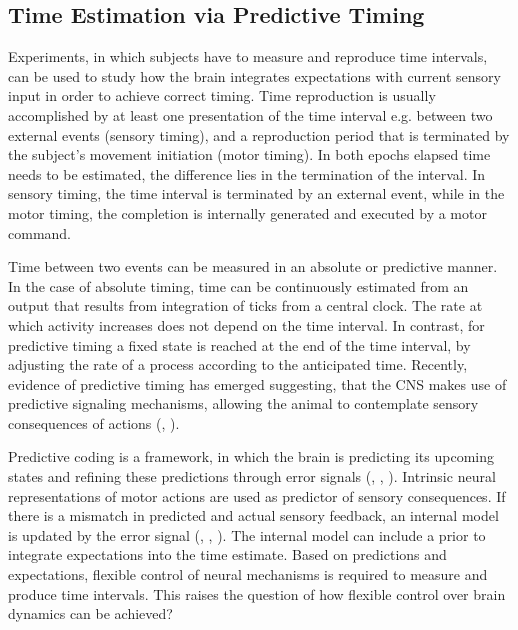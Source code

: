 \documentclass[10pt]{article}
\begin{document}
\subsection{Time Estimation via Predictive Timing}
Experiments, in which subjects have to measure and reproduce time intervals, can be used to study how the brain integrates expectations with current sensory input in order to achieve correct timing.
Time reproduction is usually accomplished by at least one presentation of the time interval e.g. between two external events (sensory timing), and a reproduction period that is terminated by the subject's movement initiation (motor timing).
In both epochs elapsed time needs to be estimated, the difference lies in the termination of the interval. In sensory timing, the time interval is terminated by an external event, while in the motor timing, the completion is internally generated and executed by a motor command.

Time between two events can be measured in an absolute or predictive manner. 
In the case of absolute timing, time can be continuously estimated from an output that results from integration of ticks from a central clock.
The rate at which activity increases does not depend on the time interval. 
In contrast, for predictive timing a fixed state is reached at the end of the time interval, by adjusting the rate of a process according to the anticipated time.
Recently, evidence of predictive timing has emerged suggesting, that the CNS makes use of predictive signaling mechanisms, allowing the animal to contemplate sensory consequences of actions (\cite{Meirhaeghe2021}, \cite{Egger2019}).

Predictive coding is a framework, in which the brain is predicting its upcoming states and refining these predictions through error signals (\cite{Ficco2021}, \cite{Huang2011}, \cite{Rao1999}).
Intrinsic neural representations of motor actions are used as predictor of sensory consequences. %
If there is a mismatch in predicted and actual sensory feedback, an internal model is updated by the error signal (\cite{Straka2018}, \cite{Clark2013}, \cite{Bubic2010}). %
The internal model can include a prior to integrate expectations into the time estimate.
Based on predictions and expectations, flexible control of neural mechanisms is required to measure and produce time intervals.
This raises the question of how flexible control over brain dynamics can be achieved? 
\end{document}
